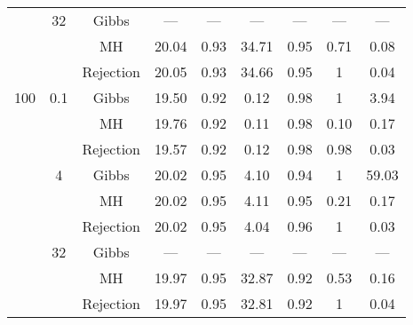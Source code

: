 {\begin{tabular}{ccccccccc}
   & 32 & Gibbs & --- & --- & --- & --- & --- & --- \\ 
   &  & MH & 20.04 & 0.93 & 34.71 & 0.95 & 0.71 & 0.08 \\ 
   &  & Rejection & 20.05 & 0.93 & 34.66 & 0.95 & 1 & 0.04 \\ 
   \cmidrule{1-9}100 & 0.1 & Gibbs & 19.50 & 0.92 & 0.12 & 0.98 & 1 & 3.94 \\ 
   &  & MH & 19.76 & 0.92 & 0.11 & 0.98 & 0.10 & 0.17 \\ 
   \vspace{0.2cm} &  & Rejection & 19.57 & 0.92 & 0.12 & 0.98 & 0.98 & 0.03 \\ 
   & 4 & Gibbs & 20.02 & 0.95 & 4.10 & 0.94 & 1 & 59.03 \\ 
   &  & MH & 20.02 & 0.95 & 4.11 & 0.95 & 0.21 & 0.17 \\ 
   \vspace{0.2cm} &  & Rejection & 20.02 & 0.95 & 4.04 & 0.96 & 1 & 0.03 \\ 
   & 32 & Gibbs & --- & --- & --- & --- & --- & --- \\ 
   &  & MH & 19.97 & 0.95 & 32.87 & 0.92 & 0.53 & 0.16 \\ 
   &  & Rejection & 19.97 & 0.95 & 32.81 & 0.92 & 1 & 0.04 \\ 
   \bottomrule 
\end{tabular}
}
